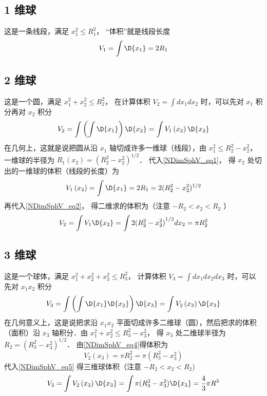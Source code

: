 \subsection{ 1 维球}
这是一条线段，满足 $x_1^2 \le R_1^2$， “体积”就是线段长度
\begin{equation}\label{NDimSphV_eq1}
{V_1} = \int {\D {x_1}}  = 2{R_1}
\end{equation}
\subsection{ 2 维球}
这是一个圆，满足 $x_1^2 + x_2^2 \le R_2^2$， 在计算体积 ${V_2} = \int {d{x_1}d{x_2}} $ 时，可以先对 ${x_1}$ 积分再对 ${x_2}$ 积分
\begin{equation}\label{NDimSphV_eq2}
{V_2} = \int {\left( {\int {\D {x_1}} } \right)\D {x_2}}  = \int {{V_1}\left( {x_2} \right)\D {x_2}} 
\end{equation}
在几何上，这就是说把圆从沿 ${x_1}$ 轴切成许多一维球（线段），由 $x_1^2 \le R_2^2 - x_2^2$， 一维球的半径为 ${R_1}\left( {{x_2}} \right) = {(R_2^2 - x_2^2)^{1/2}}$． 代入\autoref{NDimSphV_eq1}， 得 ${x_2}$ 处切出的一维球的体积（线段的长度）为
\begin{equation}\label{NDimSphV_eq3}
{V_1}\left( {x_2} \right) = \int {\D {x_1}}  = 2{R_1} = 2{(R_2^2 - x_2^2)^{1/2}}
\end{equation}
再代入\autoref{NDimSphV_eq2}， 得二维求的体积为（注意 $ - {R_2} < {x_2} < {R_2}$ ）
\begin{equation}\label{NDimSphV_eq4}
{V_2} = \int {{V_1}\D {x_2}}  = \int {2{{(R_2^2 - x_2^2)}^{1/2}}d{x_2}}  = \pi R_2^2
\end{equation}
\subsection{ 3 维球}
这是一个球体，满足 $x_1^2 + x_2^2 + x_3^2 \le R_3^2$， 计算体积 ${V_3} = \int {d{x_1}d{x_2}} d{x_3}$ 时，可以先对 ${x_1}{x_2}$ 积分
\begin{equation}\label{NDimSphV_eq5}
{V_3} = \int {\left( {\int {\D {x_1}\D {x_2}} } \right)\D {x_3}}  = \int {{V_2}\left( {x_3} \right)\D {x_3}} 
\end{equation}
在几何意义上，这是说把求沿 ${x_1}{x_2}$ 平面切成许多二维球（圆），然后把求的体积（面积）沿 ${x_3}$ 轴积分．由 $x_1^2 + x_2^2 \le R_3^2 - x_3^2$， 得 ${x_3}$ 处二维球半径为 ${R_2} = {(R_3^2 - x_3^2)^{1/2}}$． 由\autoref{NDimSphV_eq4}得体积为
\begin{equation}\label{NDimSphV_eq6}
{V_2}\left( {x_3} \right) = \pi R_2^2 = \pi (R_3^2 - x_3^2)
\end{equation}
代入\autoref{NDimSphV_eq5} 得三维球体积（注意 $ - {R_2} < {x_2} < {R_2}$)
\begin{equation}\label{NDimSphV_eq7}
{V_3} = \int {{V_2}\left( {x_3} \right)\D {x_3}}  = \int {\pi (R_3^2 - x_3^2)\D {x_3}}  = \frac{4}{3}\pi {R^3}
\end{equation}
